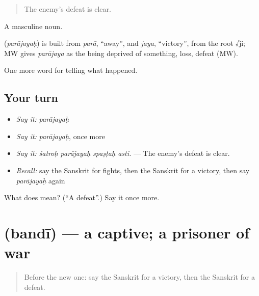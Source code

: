 \begin{quote}
The enemy's defeat is clear.
\end{quote}

A masculine noun.

\begin{cousinweb}
\textbf{} (\emph{parājayaḥ}) is built from \emph{parā}, \textquotedblleft{}away\textquotedblright{}, and \emph{jaya}, \textquotedblleft{}victory\textquotedblright{}, from the root √ji; MW gives \emph{parājaya} as the being deprived of something, loss, defeat (MW).
\end{cousinweb}

\begin{grammarlens}[title={What you've built}]
One more word for telling what happened.
\end{grammarlens}

\subsection*{Your turn}
\begin{itemize}
\raggedright
  \item \emph{Say it:} \emph{parājayaḥ}
  \item \emph{Say it:} \emph{parājayaḥ}, once more
  \item \emph{Say it:} \emph{śatroḥ parājayaḥ spaṣṭaḥ asti.} — The enemy's defeat is clear.
  \item \emph{Recall:} say the Sanskrit for fights, then the Sanskrit for a victory, then say \emph{parājayaḥ} again
\end{itemize}

\begin{tcolorbox}[breakable,colback=teal!4,colframe=teal!35!black,title={Before you move on}]
What does  mean? (\textquotedblleft{}A defeat\textquotedblright{}.) Say it once more.
\end{tcolorbox}
\section[\texorpdfstring{\sk{बन्दी} (bandī)}{बन्दी (bandī)}]{ (bandī) — a captive; a prisoner of war}

\label{lesson:SA-C319-bandi}



\begin{quote}
Before the new one: say the Sanskrit for a victory, then the Sanskrit for a defeat.
\end{quote}

